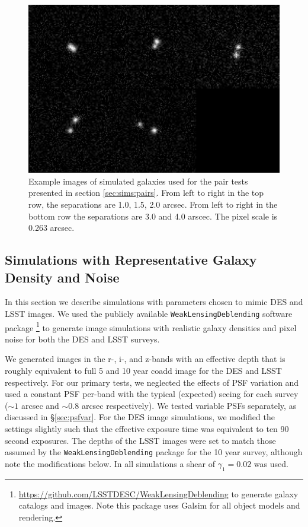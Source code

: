 \documentclass[draft, iop, twocolappendix, appendixfloats, numberedappendix, apj]{hackemulateapj}
\begin{document}
\begin{figure}
    \begin{center}
        \includegraphics[width=\textwidth]{bdk-comb.png}
        \caption{Example images of simulated galaxies used for the pair tests
        presented in section \ref{sec:sims:pairs}.  From left to right in the top row,
        the separations are 1.0, 1.5, 2.0 arcsec. From left to right in the bottom row the
        separations are 3.0 and 4.0 arscec. The pixel scale is 0.263 arcsec.
        \label{fig:pairs}}
    \end{center}
\end{figure}

\subsection{Simulations with Representative Galaxy Density and Noise}
\label{sec:sims:realgals}

In this section we describe simulations with parameters chosen to mimic DES and
LSST images.  We used the publicly available \texttt{WeakLensingDeblending}
software package
\citep{WeakLensingDeblending}\footnote{\url{https://github.com/LSSTDESC/WeakLensingDeblending}
to generate galaxy catalogs and images.  Note this package uses Galsim for all
object models and rendering.} to generate image simulations with
realistic galaxy densities and pixel noise for both the DES and LSST surveys.

We generated images in the r-, i-, and z-bands with an effective depth that is
roughly equivalent to full 5 and 10 year coadd image for the DES and LSST
respectively. For our primary tests, we neglected the effects of PSF variation
and used a constant PSF per-band with the typical (expected) seeing for each
survey ($\sim\!1$ arcsec and $\sim\!0.8$ arcsec respectively). We tested
variable PSFs separately, as discussed in \S \ref{sec:psfvar}.  For the DES
image simulations, we modified the settings slightly such that the effective
exposure time was equivalent to ten 90 second exposures. The depths of the LSST
images were set to match those assumed by the \texttt{WeakLensingDeblending}
package for the 10 year survey, although note the modifications below. In all
simulations a shear of $\gamma_1 = 0.02$ was used.
\end{document}
